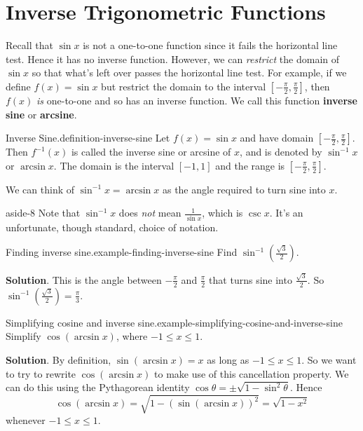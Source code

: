 \documentclass[10pt,]{book}
\newcommand{\terminology}[1]{\textbf{#1}}
\numberwithin{equation}{section}
\begin{document}
\section[{Inverse Trigonometric Functions}]{Inverse Trigonometric Functions}\label{section-inverse-trigonometric-functions}
\hypertarget{p-257}{}%
Recall that \(\sin x\) is not a one-to-one function since it fails the horizontal line test. Hence it has no inverse function. However, we can \emph{restrict} the domain of \(\sin x\) so that what's left over passes the horizontal line test. For example, if we define \(f(x) = \sin x\) but restrict the domain to the interval \([-\frac{\pi}{2},\frac{\pi}{2}]\), then \(f(x)\) \emph{is} one-to-one and so has an inverse function. We call this function \terminology{inverse sine} or \terminology{arcsine}.%
\begin{definition}{Inverse Sine.}{definition-inverse-sine}%
\hypertarget{p-258}{}%
Let \(f(x) = \sin x\) and have domain \([-\frac{\pi}{2},\frac{\pi}{2}]\). Then \(f^{-1}(x)\) is called the inverse sine or arcsine of \(x\), and is denoted by \(\sin^{-1}x\) or \(\arcsin x\). The domain is the interval \([-1,1]\) and the range is \([-\frac{\pi}{2},\frac{\pi}{2}]\).%
\end{definition}
\hypertarget{p-259}{}%
We can think of \(\sin^{-1}x = \arcsin x\) as the angle required to turn sine into \(x\). \begin{aside}{}{aside-8}%
\hypertarget{p-260}{}%
Note that \(\sin^{-1}x\) does \emph{not} mean \(\frac{1}{\sin x}\), which is \(\csc x\). It's an unfortunate, though standard, choice of notation.%
\end{aside}
%
\begin{example}{Finding inverse sine.}{example-finding-inverse-sine}%
\hypertarget{p-261}{}%
Find \(\sin^{-1}(\frac{\sqrt{3}}{2})\).%
\par\smallskip%
\noindent\textbf{Solution}.\hypertarget{solution-56}{}\quad%
\hypertarget{p-262}{}%
This is the angle between \(-\frac{\pi}{2}\) and \(\frac{\pi}{2}\) that turns sine into \(\frac{\sqrt{3}}{2}\). So \(\sin^{-1}(\frac{\sqrt{3}}{2}) = \frac{\pi}{3}\).%
\end{example}
\begin{example}{Simplifying cosine and inverse sine.}{example-simplifying-cosine-and-inverse-sine}%
\hypertarget{p-263}{}%
Simplify \(\cos(\arcsin x)\), where \(-1\leq x\leq 1\).%
\par\smallskip%
\noindent\textbf{Solution}.\hypertarget{solution-57}{}\quad%
\hypertarget{p-264}{}%
By definition, \(\sin(\arcsin x) = x\) as long as \(-1\leq x\leq 1\). So we want to try to rewrite \(\cos(\arcsin x)\) to make use of this cancellation property. We can do this using the Pythagorean identity \(\cos \theta = \pm\sqrt{1-\sin^{2}\theta}\). Hence%
\begin{equation*}
\cos(\arcsin x) = \sqrt{1-(\sin(\arcsin x))^{2}} = \sqrt{1 - x^{2}}
\end{equation*}
whenever \(-1\leq x\leq 1\).%
\end{example}
\end{document}
